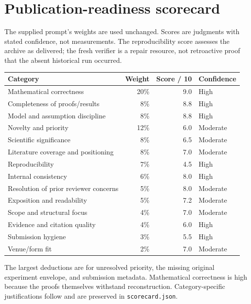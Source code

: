 \documentclass[
  11pt,
]{article}
\begin{document}
\section{Publication-readiness
scorecard}\label{publication-readiness-scorecard}

The supplied prompt's weights are used unchanged. Scores are judgments
with stated confidence, not measurements. The reproducibility score
assesses the archive as delivered; the fresh verifier is a repair
resource, not retroactive proof that the absent historical run occurred.

\begin{longtable}[]{@{}lrrl@{}}
\toprule\noalign{}
Category & Weight & Score / 10 & Confidence \\
\midrule\noalign{}
\endhead
\bottomrule\noalign{}
\endlastfoot
Mathematical correctness & 20\% & 9.0 & High \\
Completeness of proofs/results & 8\% & 8.8 & High \\
Model and assumption discipline & 8\% & 8.8 & High \\
Novelty and priority & 12\% & 6.0 & Moderate \\
Scientific significance & 8\% & 6.5 & Moderate \\
Literature coverage and positioning & 8\% & 7.0 & Moderate \\
Reproducibility & 7\% & 4.5 & High \\
Internal consistency & 6\% & 8.0 & High \\
Resolution of prior reviewer concerns & 5\% & 8.0 & Moderate \\
Exposition and readability & 5\% & 7.2 & Moderate \\
Scope and structural focus & 4\% & 7.0 & Moderate \\
Evidence and citation quality & 4\% & 6.0 & High \\
Submission hygiene & 3\% & 5.5 & High \\
Venue/form fit & 2\% & 7.0 & Moderate \\
\end{longtable}

The largest deductions are for unresolved priority, the missing original
experiment envelope, and submission metadata. Mathematical correctness
is high because the proofs themselves withstand reconstruction.
Category-specific justifications follow and are preserved in
\nolinkurl{scorecard.json}.
\end{document}
